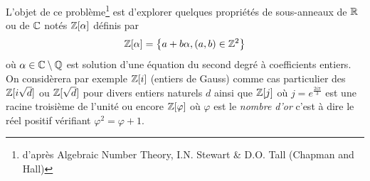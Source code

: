 L'objet de ce problème\footnote{d'après Algebraic Number Theory, I.N. Stewart \& D.O. Tall (Chapman and Hall)} est d'explorer quelques propriétés de sous-anneaux de $\mathbb{R}$ ou de $\mathbb{C}$ notés $\mathbb{Z}[\alpha]$ définis par 
\begin{displaymath}
  \mathbb{Z}[\alpha] = \left\lbrace a + b\alpha , (a,b)\in \mathbb{Z}^2 \right\rbrace 
\end{displaymath}
où $\alpha \in \mathbb{C} \setminus \mathbb{Q}$ est solution d'une équation du second degré à coefficients entiers.\newline
On considèrera par exemple $\mathbb{Z}[i]$ (entiers de Gauss) comme cas particulier des $\mathbb{Z}[i\sqrt{d}]$ ou $\mathbb{Z}[\sqrt{d}]$ pour divers entiers naturels $d$ ainsi que $\mathbb{Z}[j]$ où $j=e^{\frac{2i\pi}{3}}$ est une racine troisième de l'unité ou encore $\mathbb{Z}[\varphi]$ où $\varphi$ est le \emph{nombre d'or} c'est à dire le réel positif vérifiant $\varphi^2 = \varphi + 1$.
